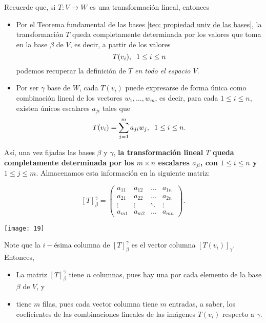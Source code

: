Recuerde que, si $T: V \longrightarrow W$ es una transformación lineal,
entonces
\begin{itemize}
	\item Por el Teorema fundamental de las bases 
	\ref{teo: propiedad univ de las bases}, 
	la transformación $T$ queda completamente
	determinada por los valores que toma en la base $\beta$ de $V$,
	es decir, a partir de los valores
	\[
	T(v_{i}), \hspace{0.2cm} 1 \leq i \leq n
	\]
	podemos recuperar la definición de $T$ \textit{en todo el espacio
	$V$}.
	\item Por ser $\gamma$ base de $W$, cada $T(v_{i})$ puede
	expresarse de forma única como combinación lineal de 
	los vectores $w_{1}, \ldots, w_{m}$, es decir,
	para cada $1 \leq i \leq n$, existen únicos escalares
	$a_{ji}$ tales que
	\begin{equation}
		\label{eq: 24 oct, 1}
	T(v_{i}) = \sum_{j = 1}^{m} a_{ji} w_{j}, 
	\hspace{0.2cm} 1 \leq i \leq n.
	\end{equation}
\end{itemize}
Así, una vez fijadas las bases $\beta$ y $\gamma$, 
\textbf{la transformación lineal $T$ queda completamente determinada
por los $m \times n$ escalares $a_{ji}$, con $1 \leq i \leq n$ y
$1 \leq j \leq m$}. Almacenamos esta información en la siguiente
matriz:

\begin{equation}
	\label{eq: representacion matricial T}
	[T]_{\beta}^{\gamma} = 
	\begin{pmatrix}
	a_{11} & a_{12} & \ldots & a_{1n} \\
	a_{21} & a_{22} & \ldots & a_{2n} \\
	\vdots & \vdots & \ddots & \vdots \\
	a_{m1} & a_{m2} & \ldots & a_{mn} 
	\end{pmatrix}.
\end{equation}
\begin{marginfigure}
	\texttt{[image: 19]} 
\end{marginfigure}
Note que la $i-$ésima columna de $[T]_{\beta}^{\gamma}$
es el vector columna $[T(v_{i})]_{\gamma}$. Entonces,
\begin{itemize}
	\item La matriz $[T]_{\beta}^{\gamma}$ tiene $n$ columnas,
	pues hay una por cada elemento de la base $\beta$ de $V$, y
	\item tiene $m$ filas, pues cada vector columna tiene $m$ 
	entradas, a saber, los coeficientes de las combinaciones
	lineales de las imágenes $T(v_{i})$ respecto a $\gamma$.
\end{itemize}

